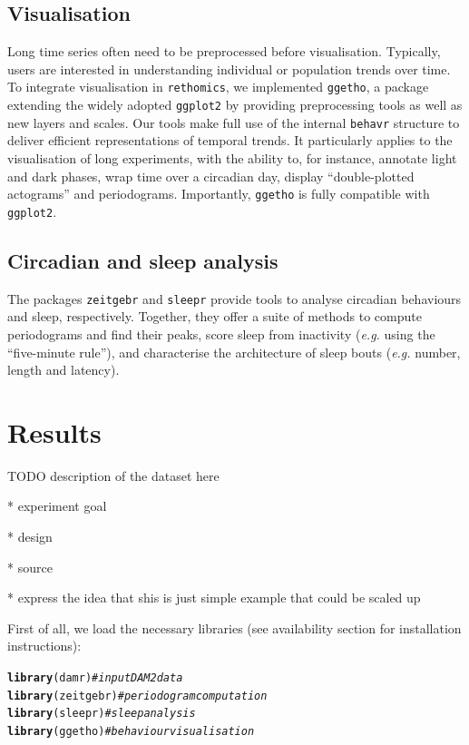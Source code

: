 \documentclass[10pt,letterpaper]{article}\usepackage[]{graphicx}\usepackage[]{color}
\makeatletter
\newcommand{\hlcom}[1]{\textcolor[rgb]{0.678,0.584,0.686}{\textit{#1}}}%
\newcommand{\hlstd}[1]{\textcolor[rgb]{0.345,0.345,0.345}{#1}}%
\newcommand{\hlkwd}[1]{\textcolor[rgb]{0.737,0.353,0.396}{\textbf{#1}}}%
\newenvironment{kframe}{%
 \def\at@end@of@kframe{}%
 \ifinner\ifhmode%
  \def\at@end@of@kframe{\end{minipage}}%
  \begin{minipage}{\columnwidth}%
 \fi\fi%
 \def\FrameCommand##1{\hskip\@totalleftmargin \hskip-\fboxsep
 \colorbox{shadecolor}{##1}\hskip-\fboxsep
     \hskip-\linewidth \hskip-\@totalleftmargin \hskip\columnwidth}%
 \MakeFramed {\advance\hsize-\width
   \@totalleftmargin\z@ \linewidth\hsize
   \@setminipage}}%
 {\par\unskip\endMakeFramed%
 \at@end@of@kframe}
\newenvironment{knitrout}{}{} %
\makeatother
\begin{document}
\subsection*{Visualisation}
Long time series often need to be preprocessed before visualisation.
Typically, users are interested in understanding individual or population trends over time.
To integrate visualisation in \texttt{rethomics},
we implemented \texttt{ggetho}, a package extending the widely adopted \texttt{ggplot2}\cite{wickham_ggplot2:_2016} by providing preprocessing tools as well as new layers and scales.
Our tools make full use of the internal \texttt{behavr} structure to deliver efficient representations of temporal trends.
It particularly applies to the visualisation of long experiments, with the ability to, for instance, annotate light and dark phases, wrap time over a circadian day, display ``double-plotted actograms'' and periodograms. 
Importantly, \texttt{ggetho} is fully compatible with \texttt{ggplot2}.

\subsection*{Circadian and sleep analysis}
The packages \texttt{zeitgebr} and \texttt{sleepr} provide tools to analyse circadian behaviours and sleep, respectively.
Together, they offer a suite of methods to compute periodograms and find their peaks, score sleep from inactivity (\emph{e.g.} using the ``five-minute rule''), and characterise the architecture of sleep bouts (\emph{e.g.} number, length and latency).







\section*{Results}

TODO description of the dataset here

* experiment goal

* design

* source

* express the idea that shis is just simple example that could be scaled up



First of all, we load the necessary libraries (see availability section for installation instructions):
\begin{knitrout}
\color{fgcolor}\begin{kframe}
\begin{alltt}
\hlkwd{library}\hlstd{(damr)}      \hlcom{# input DAM2 data}
\hlkwd{library}\hlstd{(zeitgebr)}  \hlcom{# periodogram computation}
\hlkwd{library}\hlstd{(sleepr)}    \hlcom{# sleep analysis}
\hlkwd{library}\hlstd{(ggetho)}    \hlcom{# behaviour visualisation}
\end{alltt}
\end{kframe}
\end{knitrout}
\end{document}

